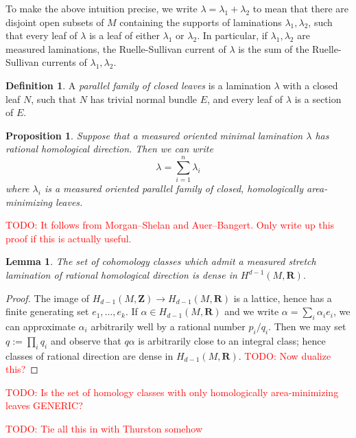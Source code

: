 \documentclass[reqno,11pt]{amsart}
\newcommand{\ZZ}{\mathbf{Z}}
\newcommand{\RR}{\mathbf{R}}
\newcommand{\Mass}{\mathbf M}
\newcommand{\Comass}{\mathbf L}
\newcommand{\dfn}[1]{\emph{#1}\index{#1}}
\newtheorem{lemma}[theorem]{Lemma}
\newtheorem{proposition}[theorem]{Proposition}
\newtheorem{corollary}[theorem]{Corollary}
\theoremstyle{definition}
\newtheorem{definition}[theorem]{Definition}
\numberwithin{equation}{section}
\newcommand\todo[1]{\textcolor{red}{TODO: #1}}
\begin{document}
To make the above intuition precise, we write $\lambda = \lambda_1 + \lambda_2$ to mean that there are disjoint open subsets of $M$ containing the supports of laminations $\lambda_1, \lambda_2$, such that every leaf of $\lambda$ is a leaf of either $\lambda_1$ or $\lambda_2$.
In particular, if $\lambda_1, \lambda_2$ are measured laminations, the Ruelle-Sullivan current of $\lambda$ is the sum of the Ruelle-Sullivan currents of $\lambda_1, \lambda_2$.

\begin{definition}
A \dfn{parallel family of closed leaves} is a lamination $\lambda$ with a closed leaf $N$, such that $N$ has trivial normal bundle $E$, and every leaf of $\lambda$ is a section of $E$.
\end{definition}

\begin{proposition}
Suppose that a measured oriented minimal lamination $\lambda$ has rational homological direction.
Then we can write
$$\lambda = \sum_{i=1}^n \lambda_i$$
where $\lambda_i$ is a measured oriented parallel family of closed, homologically area-minimizing leaves.
\end{proposition}

\todo{It follows from Morgan--Shelan and Auer--Bangert. Only write up this proof if this is actually useful.}

\begin{lemma}
The set of cohomology classes which admit a measured stretch lamination of rational homological direction is dense in $H^{d - 1}(M, \RR)$.
\end{lemma}
\begin{proof}
The image of $H_{d - 1}(M, \ZZ) \to H_{d - 1}(M, \RR)$ is a lattice, hence has a finite generating set $e_1, \dots, e_k$.
If $\alpha \in H_{d - 1}(M, \RR)$ and we write $\alpha = \sum_i \alpha_i e_i$, we can approximate $\alpha_i$ arbitrarily well by a rational number $p_i/q_i$.
Then we may set $q := \prod_i q_i$ and observe that $q \alpha$ is arbitrarily close to an integral class; hence classes of rational direction are dense in $H_{d - 1}(M, \RR)$. \todo{Now dualize this?}
\end{proof}

\todo{Is the set of homology classes with only homologically area-minimizing leaves GENERIC?}



\todo{Tie all this in with Thurston somehow}

\end{document}
